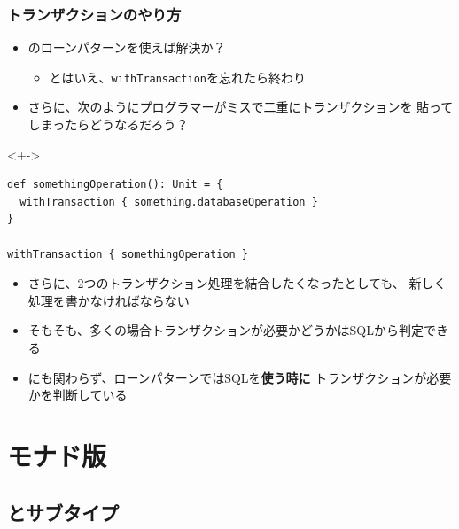 \begin{frame}[fragile]
  \frametitle{トランザクションのやり方}

  \begin{itemize}
    \item<+-> のローンパターンを使えば解決か？
    \begin{itemize}
      \item<+-> とはいえ、\lstinline|withTransaction|を忘れたら終わり
    \end{itemize}
    
    \item<+-> さらに、次のようにプログラマーがミスで二重にトランザクションを
    貼ってしまったらどうなるだろう？    
  \end{itemize}

  \begin{uncoverenv}<+->
\begin{lstlisting}[style=scala]
def somethingOperation(): Unit = {
  withTransaction { something.databaseOperation }
}
    
withTransaction { somethingOperation }
\end{lstlisting}
  \end{uncoverenv}

  \begin{itemize}
    \item<+-> さらに、2つのトランザクション処理を結合したくなったとしても、
    新しく処理を書かなければならない
    
    \item<+-> そもそも、多くの場合トランザクションが必要かどうかはSQLから判定できる
    
    \item<+-> にも関わらず、ローンパターンではSQLを\textbf{使う時に}
    トランザクションが必要かを判断している
  \end{itemize}
\end{frame}

\section{モナド版\protect\Fujitask}

\subsection{\protect\Fujitask とサブタイプ}

